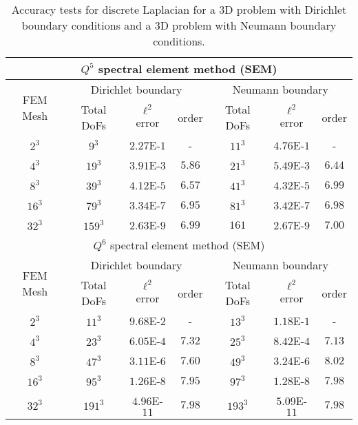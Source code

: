 \begin{table}[!ht]
    \centering
    \begin{tabular}{|c|c c c|c c c|}
    \hline
    \multicolumn{7}{|c|}{$Q^5$ spectral element method (SEM)}\\
    \hline
    \multirow{2}{*}{FEM Mesh} &  \multicolumn{3}{c|}{Dirichlet boundary} &  \multicolumn{3}{c|}{Neumann boundary}\\
     & {Total DoFs}  & $\ell^2$ error & order & {Total DoFs}  & $\ell^2$ error & order\\
    \hline
    $2^3$ &$9^3$ &  $2.27$E-$1$ & - & $11^3$ & $4.76$E-$1$ & - \\
    \hline
    $4^3$ & $19^3$ &  $3.91$E-$3$ & $5.86$ & $21^3$ & $5.49$E-$3$ & $6.44$\\
    \hline
    $8^3$ & $39^3$ &  $4.12$E-$5$ & $6.57$ & $41^3$ & $4.32$E-$5$ & $6.99$\\
    \hline
    $16^3$ & $79^3$ & $3.34$E-$7$ & $6.95$ & $81^3$ & $3.42$E-$7$ & $6.98$\\
    \hline
    $32^3$ & $159^3$ & $2.63$E-$9$ & $6.99$ & $161$ & $2.67$E-$9$ & $7.00$\\
    \hline
    \hline
    \multicolumn{7}{|c|}{$Q^6$ spectral element method (SEM)}\\
    \hline
    \multirow{2}{*}{FEM Mesh} &  \multicolumn{3}{c|}{Dirichlet boundary} & \multicolumn{3}{c|}{Neumann boundary}\\
     & {Total DoFs}  & $\ell^2$ error & order & {Total DoFs}  & $\ell^2$ error & order\\
    \hline
    $2^3$ & $11^3$ &  $9.68$E-$2$ & - & $13^3$ & $1.18$E-$1$ & - \\
    \hline
    $4^3$ & $23^3$ &  $6.05$E-$4$ & $7.32$ & $25^3$ & $8.42$E-$4$ & $7.13$\\
    \hline
     $8^3$ & $47^3$ & $3.11$E-$6$ & $7.60$ & $49^3$ & $3.24$E-$6$ & $8.02$\\
    \hline
    $16^3$ & $95^3$ & $1.26$E-$8$ & $7.95$ & $97^3$ & $1.28$E-$8$ & $7.98$\\
    \hline
    $32^3$ & $191^3$ & $4.96$E-$11$ & $7.98$ & $193^3$ & $5.09$E-$11$ & $7.98$\\
    \hline
    \end{tabular}
    \caption{Accuracy tests for discrete Laplacian for a 3D problem with Dirichlet boundary conditions and a 3D problem with Neumann boundary conditions.}
    \label{tab1:accuracy test dirichlet/neumann}
\end{table}



